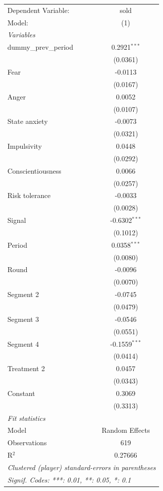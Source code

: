 
\begingroup
\centering
\scriptsize
\begin{tabular}{lc}
   \tabularnewline \midrule \midrule
   Dependent Variable: & sold\\
   Model:              & (1)\\
   \midrule
   \emph{Variables}\\
   dummy\_prev\_period & 0.2921$^{***}$\\
                       & (0.0361)\\
   Fear                & -0.0113\\
                       & (0.0167)\\
   Anger               & 0.0052\\
                       & (0.0107)\\
   State anxiety       & -0.0073\\
                       & (0.0321)\\
   Impulsivity         & 0.0448\\
                       & (0.0292)\\
   Conscientiousness   & 0.0066\\
                       & (0.0257)\\
   Risk tolerance      & -0.0033\\
                       & (0.0028)\\
   Signal              & -0.6302$^{***}$\\
                       & (0.1012)\\
   Period              & 0.0358$^{***}$\\
                       & (0.0080)\\
   Round               & -0.0096\\
                       & (0.0070)\\
   Segment 2           & -0.0745\\
                       & (0.0479)\\
   Segment 3           & -0.0546\\
                       & (0.0551)\\
   Segment 4           & -0.1559$^{***}$\\
                       & (0.0414)\\
   Treatment 2         & 0.0457\\
                       & (0.0343)\\
   Constant            & 0.3069\\
                       & (0.3313)\\
   \midrule
   \emph{Fit statistics}\\
   Model              & Random Effects\\
   Observations       & 619\\
   R$^2$              & 0.27666\\
   \midrule \midrule
   \multicolumn{2}{l}{\emph{Clustered (player) standard-errors in parentheses}}\\
   \multicolumn{2}{l}{\emph{Signif. Codes: ***: 0.01, **: 0.05, *: 0.1}}\\
\end{tabular}
\par\endgroup


